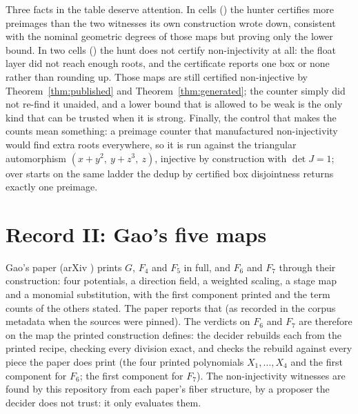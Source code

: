 \documentclass[11pt]{article}
\newcommand{\verdict}[1]{\textsc{#1}}
\begin{document}
\begin{table}[t]\centering\small
{}
\caption{The fiber family, re-run at the run that wrote this document: \FibHits{} of \FibCells{}
cells certify non-injectivity blind. A count is a lower bound; a cell that returns one box
(\verdict{reject}) or none (\verdict{refused}) proves nothing and says so.}\label{tab:fib}
\end{table}

Three facts in the table deserve attention. In \FibExceeded{} cells (\FibExceededCells) the hunter
certifies more preimages than the two witnesses its own construction wrote down, consistent with
the nominal geometric degrees of those maps but proving only the lower bound. In two cells
(\FibFailedCells) the hunt does not certify non-injectivity at all: the float layer did not reach
enough roots, and the certificate reports one box or none rather than rounding up. Those maps are
still certified non-injective by Theorem~\ref{thm:published} and Theorem~\ref{thm:generated};
the counter simply did not re-find it unaided, and a lower bound that is allowed to be weak is
the only kind that can be trusted when it is strong. Finally, the control that makes the counts
mean something: a preimage counter that manufactured non-injectivity would find extra roots
everywhere, so it is run against the triangular automorphism $(x+y^2,\ y+z^3,\ z)$, injective by
construction with $\det J=1$; over \AutoStarts{} starts on the same ladder the dedup by certified
box disjointness returns exactly one preimage.

\section{Record II: Gao's five maps}\label{sec:gao}

Gao's paper \cite{Gao2026} (arXiv \GaoArxiv) prints $G$, $F_4$ and $F_5$ in full, and $F_6$ and
$F_7$ through their construction: four potentials, a direction field, a weighted scaling, a stage
map and a monomial substitution, with the first component printed and the term counts of the
others stated. The paper reports that \GaoAncillary{} (as recorded in the corpus metadata when
the sources were pinned). The verdicts on $F_6$ and $F_7$ are therefore
on the map the printed construction defines: the decider rebuilds each from the printed recipe,
checking every division exact, and checks the rebuild against every piece the paper does print
(the four printed polynomials $X_1,\dots,X_4$ and the first component for $F_6$; the first
component for $F_7$). The non-injectivity witnesses are found by this repository from each paper's
fiber structure, by a proposer the decider does not trust: it only evaluates them.
\end{document}
